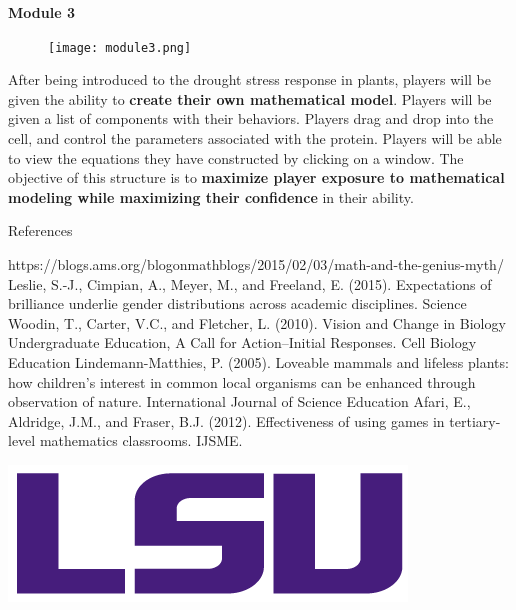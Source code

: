 \documentclass[final]{beamer}
\newlength{\onecolwid}
\begin{document}
\begin{frame}[t]
\begin{columns}[t]
\begin{column}{\onecolwid}
\begin{alertblock}{\color{Grey}\textbf{Module 3}}
	\begin{figure}
	\texttt{[image: module3.png]}
\end{figure}
\small{After being introduced to the drought stress response in plants, players will be given the ability to \textbf{create their own mathematical model}. Players will be given a list of components with their behaviors. Players drag and drop into the cell, and control the parameters associated with the protein. Players will be able to view the equations they have constructed by clicking on a window. The objective of this structure is to \textbf{maximize player exposure to mathematical modeling while maximizing their confidence }in their ability. }
\end{alertblock}

\vspace{1cm}
\begin{block}{References}
\small{
\begin{thebibliography}{99}
 https://blogs.ams.org/blogonmathblogs/2015/02/03/math-and-the-genius-myth/
Leslie, S.-J., Cimpian, A., Meyer, M., and Freeland, E. (2015). Expectations of brilliance underlie gender distributions across academic disciplines. Science 
Woodin, T., Carter, V.C., and Fletcher, L. (2010). Vision and Change in Biology Undergraduate Education, A Call for Action--Initial Responses. Cell Biology Education 
Lindemann-Matthies, P. (2005). 
Loveable mammals and lifeless plants: how children's interest in common local organisms can be enhanced through observation of nature. International Journal of Science Education
Afari, E., Aldridge, J.M., and Fraser, B.J. (2012). Effectiveness of using games in tertiary-level mathematics classrooms. IJSME.
\end{thebibliography}
}
\end{block}

\centering
\vspace{1cm}
\includegraphics[width=.5\linewidth]{LSU_Purple_RGB.png} 


\end{column} %

\end{columns} %

\end{frame} %
\end{document}
